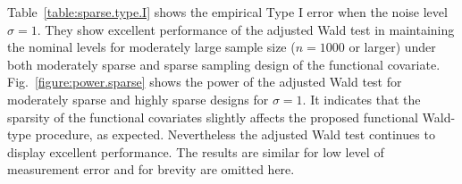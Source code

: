 \documentclass[times,sort&compress,3p]{elsarticle}
\theoremstyle{plain}%
\theoremstyle{definition}
\begin{document}
Table~\ref{table:sparse.type.I} shows the empirical Type I error when the noise level $\sigma=1$. They show excellent performance of the adjusted Wald test in maintaining the nominal levels for moderately large sample size ($n=1000$ or larger) under both moderately sparse and sparse sampling design of the functional covariate. Fig.~\ref{figure:power.sparse} shows the power of the adjusted Wald test for moderately sparse and highly sparse designs for $\sigma=1$. It indicates that the sparsity of the functional covariates slightly affects the proposed functional Wald-type procedure, as expected. Nevertheless the adjusted Wald test continues to display excellent performance. The results are similar for low level of measurement error and for brevity are omitted here. 
\end{document}
